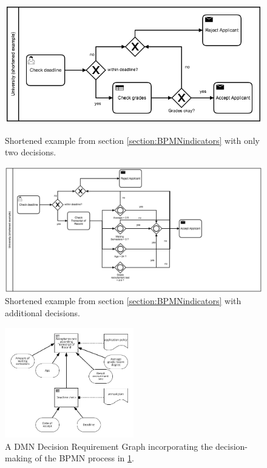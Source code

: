 \begin{figure}
  \centering
    \includegraphics[scale=0.5]{../figures/chapter_indicators/BPMN_Example_Student_Application_Short.png}
    \caption{Shortened example from section \ref{section:BPMNindicators} with only two decisions.}
  \label{fig:BPMNshortenedApplicationEx}
    \includegraphics[scale=0.4]{../figures/chapter_indicators/BPMN_Example_Student_Application_DMN_Short.png}
    \caption{Shortened example from section \ref{section:BPMNindicators} with additional decisions.}
  \label{fig:BPMNexpandedApplicationEx}
\end{figure}

\begin{figure}[!h]
\begin{center}
\includegraphics[width=0.5\textwidth]{../figures/chapter_indicators/DMN_Application_Example_Deadline_ToR.png} 
\end{center}
\caption{A DMN Decision Requirement Graph incorporating the decision-making of the BPMN process in \ref{fig:BPMNexpandedApplicationEx}.}
\label{fig:DMN_DRD_Application}
\end{figure}

